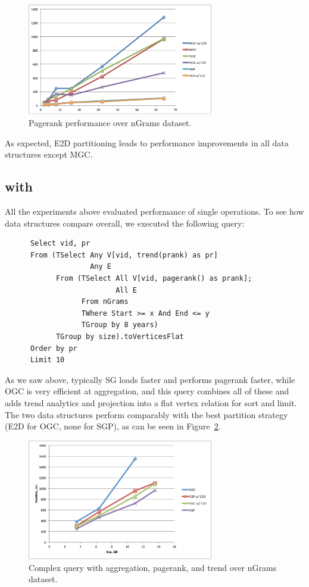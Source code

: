 \begin{figure}[t]
\includegraphics[width=3.2in]{figs/pagerank.pdf}
\caption{Pagerank performance over nGrams dataset.}
\label{fig:pagerank}
\end{figure}

As expected, E2D partitioning leads to performance improvements in all
data structures except MGC.

\subsection{ with }

All the experiments above evaluated performance of single operations.
To see how data structures compare overall, we executed the following
query:

\begin{small}
\begin{verbatim}
      Select vid, pr
      From (TSelect Any V[vid, trend(prank) as pr]
                    Any E
            From (TSelect All V[vid, pagerank() as prank]; 
                          All E
                  From nGrams
                  TWhere Start >= x And End <= y
                  TGroup by 8 years)
            TGroup by size).toVerticesFlat
      Order by pr
      Limit 10
\end{verbatim}
\end{small}

As we saw above, typically SG loads faster and performs pagerank
faster, while OGC is very efficient at aggregation, and this query
combines all of these and adds trend analytics and projection into a
flat vertex relation for sort and limit.  The two data structures
perform comparably with the best partition strategy (E2D for OGC, none
for SGP), as can be seen in Figure~\ref{fig:complexq}.

\begin{figure}[t]
\includegraphics[width=3.2in]{figs/complexq.pdf}
\caption{Complex query with aggregation, pagerank, and trend over
  nGrams dataset.}
\label{fig:complexq}
\end{figure}

